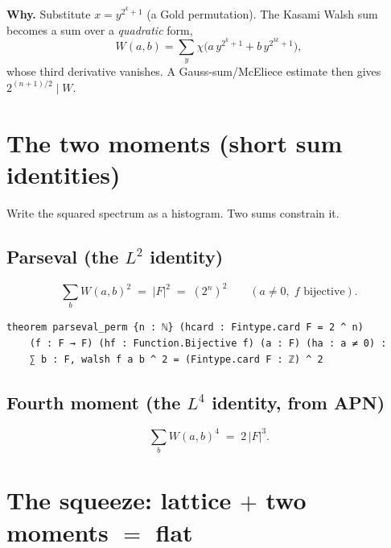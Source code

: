 \documentclass[11pt]{article}
\begin{document}
\noindent
\textbf{Why.} Substitute $x=y^{2^k+1}$ (a Gold permutation). The Kasami Walsh sum
becomes a sum over a \emph{quadratic} form,
\[
W(a,b)=\sum_{y}\chi\bigl(a\,y^{2^k+1}+b\,y^{2^{3k}+1}\bigr),
\]
whose third derivative vanishes. A Gauss-sum/McEliece estimate then gives
$2^{(n+1)/2}\mid W$.


\bigskip

\section{The two moments (short sum identities)}

\noindent
Write the squared spectrum as a histogram. Two sums constrain it.

\subsection*{Parseval (the $L^2$ identity)}
\[
\sum_{b} W(a,b)^2 \;=\; |F|^2 \;=\; (2^n)^2
\qquad (a\neq 0,\;f \text{ bijective}).
\]
\begin{lstlisting}
theorem parseval_perm {n : ℕ} (hcard : Fintype.card F = 2 ^ n)
    (f : F → F) (hf : Function.Bijective f) (a : F) (ha : a ≠ 0) :
    ∑ b : F, walsh f a b ^ 2 = (Fintype.card F : ℤ) ^ 2
\end{lstlisting}

\subsection*{Fourth moment (the $L^4$ identity, from APN)}
\[
\sum_{b} W(a,b)^4 \;=\; 2\,|F|^3 .
\]


\bigskip

\section{The squeeze: lattice $+$ two moments $=$ flat}
\end{document}
